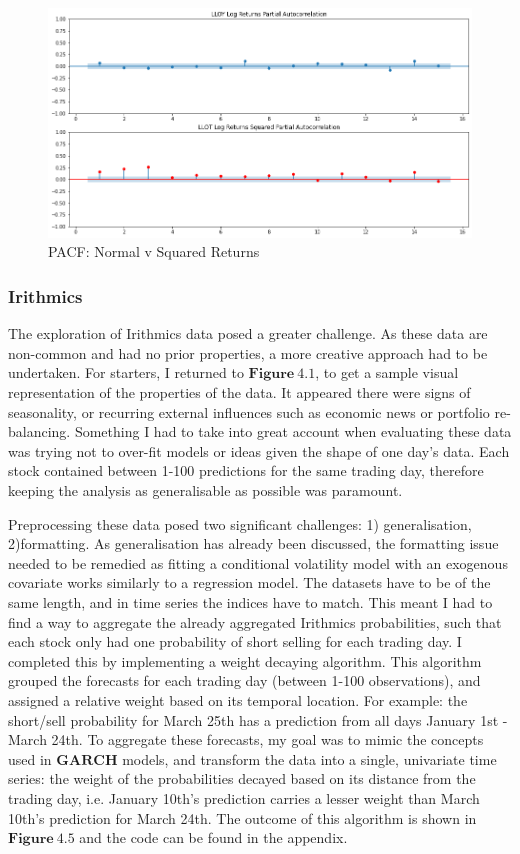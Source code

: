 \begin{figure}[H]
\centering
\includegraphics[scale=0.45]{images/PACF.png}
\caption{PACF: Normal v Squared Returns }
\label{fig: Returns v Squared}
\end{figure}

\subsubsection{Irithmics}
The exploration of Irithmics data posed a greater challenge. As these data are non-common and had no prior properties, a more creative approach had to be undertaken. For starters, I returned to $\mathbf{Figure~4.1}$, to get a sample visual representation of the properties of the data. It appeared there were signs of seasonality, or recurring external influences such as economic news or portfolio re-balancing. Something I had to take into great account when evaluating these data was trying not to over-fit models or ideas given the shape of one day's data. Each stock contained between 1-100 predictions for the same trading day, therefore keeping the analysis as generalisable as possible was paramount.    

Preprocessing these data posed two significant challenges: 1) generalisation, 2)formatting. As generalisation has already been discussed, the formatting issue needed to be remedied as fitting a conditional volatility model with an exogenous covariate works similarly to a regression model. The datasets have to be of the same length, and in time series the indices have to match. This meant I had to find a way to aggregate the already aggregated Irithmics probabilities, such that each stock only had one probability of short selling for each trading day. I completed this by implementing a weight decaying algorithm. This algorithm grouped the forecasts for each trading day (between 1-100 observations), and assigned a relative weight based on its temporal location. For example: the short/sell probability for March 25th has a prediction from all days January 1st - March 24th. To aggregate these forecasts, my goal was to mimic the concepts used in $\mathbf{GARCH}$ models, and transform the data into a single, univariate time series: the weight of the probabilities decayed based on its distance from the trading day, i.e. January 10th's prediction carries a lesser weight than March 10th's prediction for March 24th. The outcome of this algorithm is shown in $\mathbf{Figure~4.5}$ and the code can be found in the appendix. 


